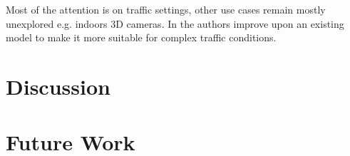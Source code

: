 \par Most of the attention is on traffic settings, other use cases remain mostly unexplored e.g. indoors 3D cameras.
In \cite{wang_voxel-rcnn-complex_2022} the authors improve upon an existing model to make it more suitable for complex traffic conditions.
\section{Discussion}

\section{Future Work}
